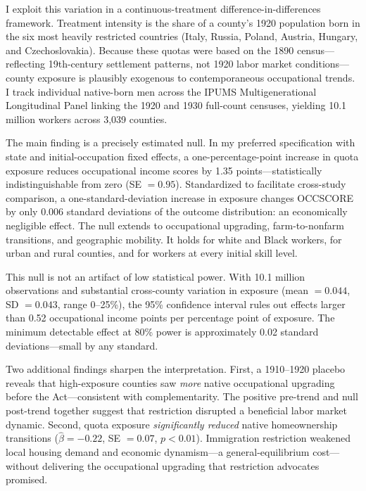\documentclass[12pt]{article}
\begin{document}
I exploit this variation in a continuous-treatment difference-in-differences framework.  Treatment intensity is the share of a county's 1920 population born in the six most heavily restricted countries (Italy, Russia, Poland, Austria, Hungary, and Czechoslovakia).  Because these quotas were based on the 1890 census---reflecting 19th-century settlement patterns, not 1920 labor market conditions---county exposure is plausibly exogenous to contemporaneous occupational trends.  I track individual native-born men across the IPUMS Multigenerational Longitudinal Panel linking the 1920 and 1930 full-count censuses, yielding 10.1 million workers across 3,039 counties.

The main finding is a precisely estimated null.  In my preferred specification with state and initial-occupation fixed effects, a one-percentage-point increase in quota exposure reduces occupational income scores by 1.35 points---statistically indistinguishable from zero (SE $= 0.95$).  Standardized to facilitate cross-study comparison, a one-standard-deviation increase in exposure changes OCCSCORE by only 0.006 standard deviations of the outcome distribution: an economically negligible effect.  The null extends to occupational upgrading, farm-to-nonfarm transitions, and geographic mobility.  It holds for white and Black workers, for urban and rural counties, and for workers at every initial skill level.

This null is not an artifact of low statistical power.  With 10.1 million observations and substantial cross-county variation in exposure (mean $= 0.044$, SD $= 0.043$, range 0--25\%), the 95\% confidence interval rules out effects larger than 0.52 occupational income points per percentage point of exposure.  The minimum detectable effect at 80\% power is approximately 0.02 standard deviations---small by any standard.

Two additional findings sharpen the interpretation.  First, a 1910--1920 placebo reveals that high-exposure counties saw \textit{more} native occupational upgrading before the Act---consistent with complementarity.  The positive pre-trend and null post-trend together suggest that restriction disrupted a beneficial labor market dynamic.  Second, quota exposure \textit{significantly reduced} native homeownership transitions ($\hat{\beta} = -0.22$, SE $= 0.07$, $p < 0.01$).  Immigration restriction weakened local housing demand and economic dynamism---a general-equilibrium cost---without delivering the occupational upgrading that restriction advocates promised.
\end{document}
